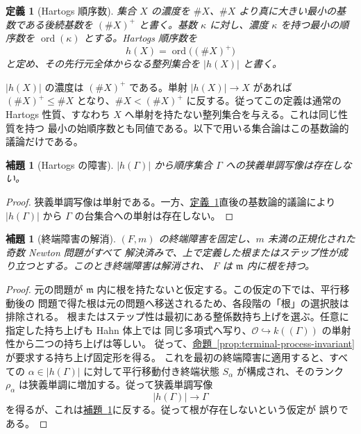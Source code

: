 \documentclass[11pt,uplatex,dvipdfmx]{jsarticle}
\newcommand{\Ocal}{\mathcal O}
\newcommand{\namedref}[2]{\hyperref[#2]{#1~\ref*{#2}}}
\theoremstyle{proofnote}
\newtheorem{lemma}[theorem]{補題}
\newtheorem{definition}[theorem]{定義}
\begin{document}
\begin{definition}[Hartogs 順序数]
\label{def:hartogs}
  集合 \(X\) の濃度を \(\#X\)、\(\#X\) より真に大きい最小の基数である後続基数を
  \((\#X)^+\) と書く。基数 \(\kappa\) に対し、濃度 \(\kappa\) を持つ最小の順序数を
  \(\operatorname{ord}(\kappa)\) とする。\emph{Hartogs 順序数}を
  \[
    h(X)=\operatorname{ord}\bigl((\#X)^+\bigr)
  \]
  と定め、その先行元全体からなる整列集合を \(|h(X)|\) と書く。
\end{definition}

\(|h(X)|\) の濃度は \((\#X)^+\) である。単射 \(|h(X)|\to X\) があれば
\((\#X)^+\le\#X\) となり、\(\#X<(\#X)^+\) に反する。従ってこの定義は通常の
Hartogs 性質、すなわち \(X\) へ単射を持たない整列集合を与える。これは同じ性質を持つ
最小の始順序数とも同値である。以下で用いる集合論はこの基数論的議論だけである。

\begin{lemma}[Hartogs の障害]
\label{lem:hartogs}
  \(|h(\Gamma)|\) から順序集合 \(\Gamma\) への狭義単調写像は存在しない。
\end{lemma}
\begin{proof}
  狭義単調写像は単射である。一方、\namedref{定義}{def:hartogs}直後の基数論的議論により
  \(|h(\Gamma)|\) から \(\Gamma\) の台集合への単射は存在しない。
\end{proof}

\begin{lemma}[終端障害の解消]
\label{lem:terminal-prefix-resolution}
  \((F,m)\) の終端障害を固定し、\(m\) 未満の正規化された奇数 Newton 問題がすべて
  解決済みで、上で定義した根またはステップ性が成り立つとする。このとき終端障害は解消され、
  \(F\) は \(\mathfrak m\) 内に根を持つ。
\end{lemma}
\begin{proof}
  元の問題が \(\mathfrak m\) 内に根を持たないと仮定する。この仮定の下では、平行移動後の
  問題で得た根は元の問題へ移送されるため、各段階の「根」の選択肢は排除される。
  根またはステップ性は最初にある整係数持ち上げを選ぶ。任意に指定した持ち上げも Hahn 体上では
  同じ多項式へ写り、\(\Ocal\hookrightarrow k((\Gamma))\) の単射性から二つの持ち上げは等しい。
  従って、\namedref{命題}{prop:terminal-process-invariant}が要求する持ち上げ固定形を得る。
  これを最初の終端障害に適用すると、すべての
  \(\alpha\in|h(\Gamma)|\) に対して平行移動付き終端状態 \(S_\alpha\) が構成され、そのランク
  \(\rho_\alpha\) は狭義単調に増加する。従って狭義単調写像
  \[
    |h(\Gamma)|\longrightarrow\Gamma
  \]
  を得るが、これは\namedref{補題}{lem:hartogs}に反する。従って根が存在しないという仮定が
  誤りである。
\end{proof}
\end{document}
